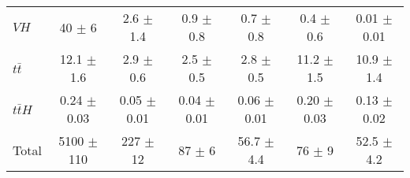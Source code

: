 \begin{tabular}{|l|c|c|c|c|c|c|}
  $VH$   & 40 $\pm$ 6 & 2.6 $\pm$ 1.4 & 0.9 $\pm$ 0.8 & 0.7 $\pm$ 0.8 & 0.4 $\pm$ 0.6 & 0.01 $\pm$ 0.01 \\ 
  $t\bar{t}$   & 12.1 $\pm$ 1.6 & 2.9 $\pm$ 0.6 & 2.5 $\pm$ 0.5 & 2.8 $\pm$ 0.5 & 11.2 $\pm$ 1.5 & 10.9 $\pm$ 1.4 \\ 
  $t\bar{t}H$   & 0.24 $\pm$ 0.03 & 0.05 $\pm$ 0.01 & 0.04 $\pm$ 0.01 & 0.06 $\pm$ 0.01 & 0.20 $\pm$ 0.03 & 0.13 $\pm$ 0.02 \\ 
\hline 
  Total  & 5100 $\pm$ 110 & 227 $\pm$ 12 & 87 $\pm$ 6 & 56.7 $\pm$ 4.4 & 76 $\pm$ 9 & 52.5 $\pm$ 4.2 \\ 
\hline 
\end{tabular} 
